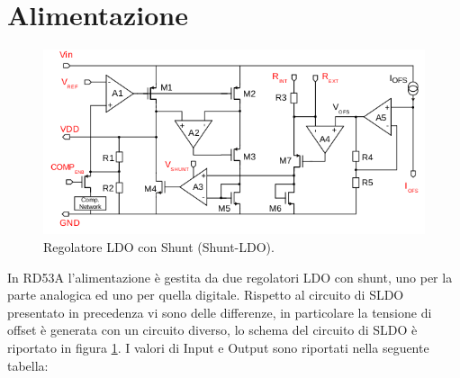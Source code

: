 \section{Alimentazione}
\begin{figure}
\centering
\includegraphics[scale=.6]{Immagini/SLDO_RD53A}
\caption{Regolatore LDO con Shunt (Shunt-LDO).}
\label{SLDO_RD53A}
\end{figure}
In RD53A l'alimentazione è gestita da due regolatori LDO con shunt, uno per la parte analogica ed uno per quella digitale. 
Rispetto al circuito di SLDO presentato in precedenza vi sono delle differenze, in particolare la tensione di offset è generata con un circuito diverso, lo schema del circuito di SLDO è riportato in  figura \ref{SLDO_RD53A}. 
I valori di Input e Output sono riportati nella seguente tabella:
